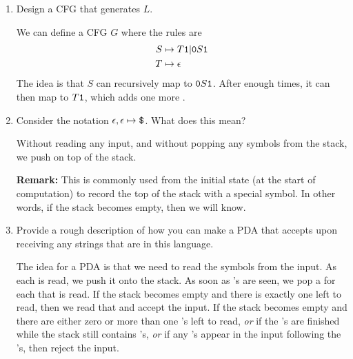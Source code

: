\documentclass[letterpaper]{article}
\begin{document}
\begin{enumerate}
    \item Design a CFG that generates $L$. 
    \begin{mdframed}[]
        We can define a CFG $G$ where the rules are 
        \begin{equation*}
            \begin{aligned}
                S &\mapsto T\texttt{1} | \texttt{0}S\texttt{1} \\ 
                T &\mapsto \epsilon
            \end{aligned}
        \end{equation*}
        The idea is that $S$ can recursively map to $\texttt{0}S\texttt{1}$. After enough times, it can then map to $T\texttt{1}$, which adds one more . 
    \end{mdframed}

    \item Consider the notation $\epsilon, \epsilon \mapsto \texttt{\$}$. What does this mean? 
    \begin{mdframed}[]
        Without reading any input, and without popping any symbols from the stack, we push \code{\$} on top of the stack. 
    \end{mdframed}
    \textbf{Remark:} This is commonly used from the initial state (at the start of computation) to record the top of the stack with a special symbol. In other words, if the stack becomes empty, then we will know. 

    \item Provide a rough description of how you can make a PDA that accepts upon receiving any strings that are in this language. 
    \begin{mdframed}[]
        The idea for a PDA is that we need to read the symbols from the input. As each  is read, we push it onto the stack. As soon as 's are seen, we pop a  for each  that is read. If the stack becomes empty and there is exactly one  left to read, then we read that  and accept the input. If the stack becomes empty and there are either zero or more than one 's left to read, \emph{or} if the 's are finished while the stack still contains 's, \emph{or} if any 's appear in the input following the 's, then reject the input. 
    \end{mdframed}


\end{enumerate}
\end{document}
